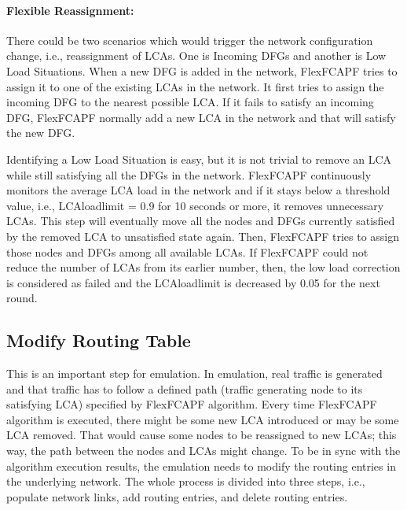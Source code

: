\paragraph{Flexible Reassignment:}
There could be two scenarios which would trigger the network configuration change, i.e., reassignment of LCAs. One is Incoming DFGs and another is Low Load Situations. When a new DFG is added in the network, FlexFCAPF tries to assign it to one of the existing LCAs in the network. It first tries to assign the incoming DFG to the nearest possible LCA. If it fails to satisfy an incoming DFG, FlexFCAPF normally add a new LCA in the network and that will satisfy the new DFG.

Identifying a Low Load Situation is easy, but it is not trivial to remove an LCA while still satisfying all the DFGs in the network. FlexFCAPF continuously monitors the average LCA load in the network and if it stays below a threshold value, i.e., LCAloadlimit = 0.9 for 10 seconds or more, it removes unnecessary LCAs. This step will eventually move all the nodes and DFGs currently satisfied by the removed LCA to unsatisfied state again. Then, FlexFCAPF tries to assign those nodes and DFGs among all available LCAs. If FlexFCAPF could not reduce the number of LCAs from its earlier number, then, the low load correction is considered as failed and the LCAloadlimit is decreased by 0.05 for the next round.

\subsection{Modify Routing Table}\label{sec:mrt}
This is an important step for emulation. In emulation, real traffic is generated and that traffic has to follow a defined path (traffic generating node to its satisfying LCA) specified by FlexFCAPF algorithm. Every time FlexFCAPF algorithm is executed, there might be some new LCA introduced or may be some LCA removed. That would cause some nodes to be reassigned to new LCAs; this way, the path between the nodes and LCAs might change. To be in sync with the algorithm execution results, the emulation needs to modify the routing entries in the underlying network. The whole process is divided into three steps, i.e., populate network links, add routing entries, and delete routing entries.

